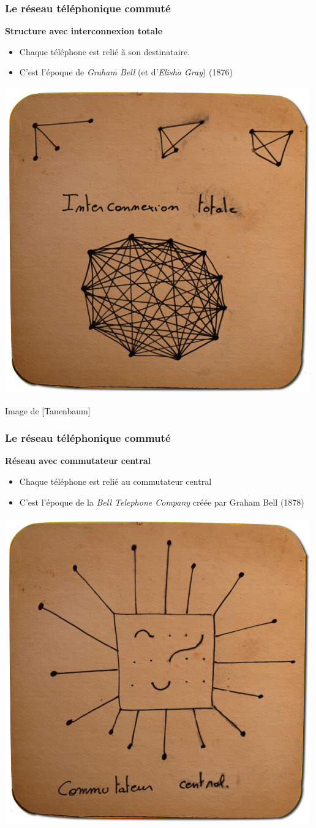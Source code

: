 \begin{frame}[fragile]
  \frametitle{Le réseau téléphonique commuté}
{\large\bf Structure avec interconnexion totale}
\begin{itemize}
	\item Chaque téléphone est relié à son destinataire.
	\item C'est l'époque de \textit{Graham Bell} (et d'\textit{Elisha Gray}) (1876)
\end{itemize}
\begin{center}
	\includegraphics[width=.53\linewidth]{img/sousbock-rtc-interconnexiontotale.png}
	\par{\scriptsize Image de [Tanenbaum]} 
\end{center}
\end{frame}

\begin{frame}[fragile]
  \frametitle{Le réseau téléphonique commuté}
{\large\bf Réseau avec commutateur central}
\begin{itemize}
	\item Chaque téléphone est relié au commutateur central
	\item C'est l'époque de la \textit{Bell Telephone Company} créée par Graham Bell (1878)
\end{itemize}
\begin{center}
	\includegraphics[width=.5\linewidth]{img/sousbock-rtc-commutateurcentral.png}
\end{center}
\end{frame}

